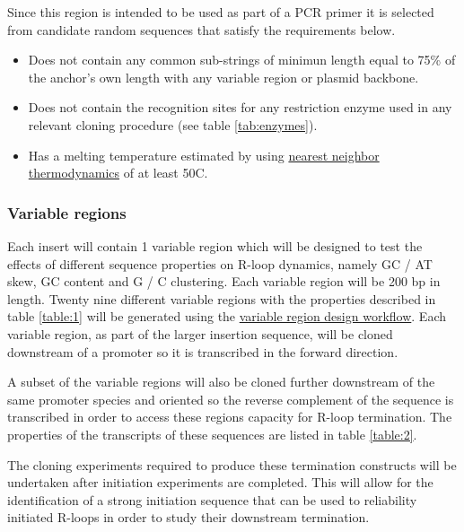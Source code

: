 \documentclass[11pt]{article}
\begin{document}
Since this region is intended to be used as part of a PCR primer it is selected from candidate random sequences that satisfy the requirements below.

\begin{itemize}
	\item Does not contain any common sub-strings of minimun length equal to 75\% of the anchor's own length with any variable region or plasmid backbone.
	\item Does not contain the recognition sites for any restriction enzyme used in any relevant cloning procedure (see table \ref{tab:enzymes}).
	\item Has a melting temperature estimated by using \href{https://biopython.org/docs/1.75/api/Bio.SeqUtils.MeltingTemp.html#Bio.SeqUtils.MeltingTemp.Tm_GC}{nearest neighbor thermodynamics} of at least 50\textdegree C.
\end{itemize}

\subsubsection{Variable regions}

Each insert will contain 1 variable region which will be designed to test the effects of different sequence properties on R-loop dynamics, namely GC / AT skew, GC content and G / C clustering. Each variable region will be 200 bp in length. Twenty nine different variable regions with the properties described in table \ref{table:1} will be generated using the \href{https://github.com/EthanHolleman/plasmid-VR-design}{variable region design workflow}. Each variable region, as part of the larger insertion sequence, will be cloned downstream of a promoter so it is transcribed in the forward direction. 



A subset of the variable regions will also be cloned further downstream of the same promoter species and oriented so the reverse complement of the sequence is transcribed in order to access these regions capacity for R-loop termination. The properties of the transcripts of these sequences are listed in table \ref{table:2}. 



The cloning experiments required to produce these termination constructs will be undertaken after initiation experiments are completed. This will allow for the identification of a strong initiation sequence that can be used to reliability initiated R-loops in order to study their downstream termination. 
\end{document}
